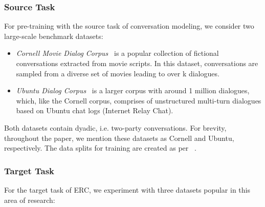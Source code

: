 \documentclass[preprint,3pt]{elsarticle}
\begin{document}
\subsubsection{Source Task} 

For pre-training with the source task of conversation modeling, we consider two large-scale benchmark datasets: 
	
	\begin{itemize}
		\item  \textit{Cornell Movie Dialog Corpus}~\cite{danescu2011chameleons} is a popular collection of fictional conversations extracted from movie scripts. In this dataset, conversations are sampled from a diverse set of  movies leading to over k dialogues. 
        \item  \textit{Ubuntu Dialog Corpus}~\cite{lowe2015ubuntu} is a larger corpus with around 1 million dialogues, which, like the Cornell corpus, comprises of unstructured multi-turn dialogues based on Ubuntu chat logs (Internet Relay Chat).
	\end{itemize}
	
	Both datasets contain dyadic, i.e. two-party conversations. For brevity, throughout the paper, we mention these datasets as Cornell and Ubuntu, respectively. The data splits for training are created as per ~\citet{park2018hierarchical}.

\subsubsection{Target Task} 

For the target task of ERC, we experiment with three datasets popular in this area of research:
	
\end{document}
